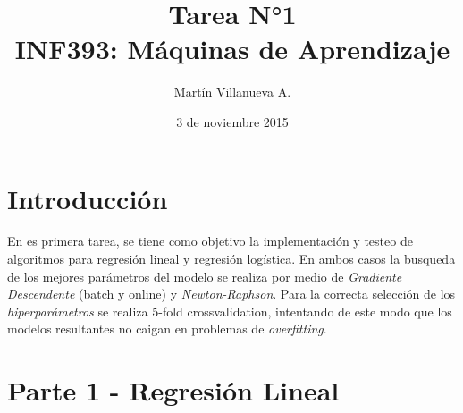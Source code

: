 \documentclass[spanish, fleqn]{article}
\title{Tarea N°1 \\INF393: Máquinas de Aprendizaje}
\author{Martín Villanueva A.}
\date{3 de noviembre 2015}
\begin{document}
\maketitle

\thispagestyle{empty}

\section*{Introducción}

En es primera tarea, se tiene como objetivo la implementación y testeo de algoritmos para regresión lineal y regresión logística. En ambos casos la busqueda de  los mejores parámetros del modelo se realiza por medio de 	\textit{Gradiente Descendente} (batch y online) y \textit{Newton-Raphson}. Para la correcta selección de los \textit{hiperparámetros} se realiza 5-fold crossvalidation, intentando de este modo que los modelos resultantes no caigan en problemas de \textit{overfitting}.

\section*{Parte 1 - Regresión Lineal}
\end{document}
